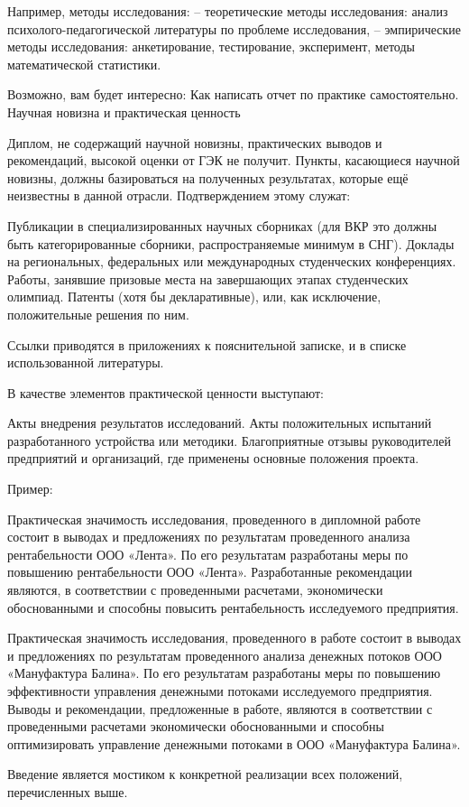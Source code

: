     Например, методы исследования:
    – теоретические методы исследования: анализ психолого-педагогической литературы по проблеме исследования,
    – эмпирические методы исследования: анкетирование, тестирование, эксперимент, методы математической статистики.

Возможно, вам будет интересно: Как написать отчет по практике самостоятельно.
Научная новизна и практическая ценность

Диплом, не содержащий научной новизны, практических выводов и рекомендаций, высокой оценки от ГЭК не получит. Пункты, касающиеся научной новизны, должны базироваться на полученных результатах, которые ещё неизвестны в данной отрасли. Подтверждением этому служат:

    Публикации в специализированных научных сборниках (для ВКР это должны быть категорированные сборники, распространяемые минимум в СНГ).
    Доклады на региональных, федеральных или международных студенческих конференциях.
    Работы, занявшие призовые места на завершающих этапах студенческих олимпиад.
    Патенты (хотя бы декларативные), или, как исключение, положительные решения по ним.

Ссылки приводятся в приложениях к пояснительной записке, и в списке использованной литературы.

В качестве элементов практической ценности выступают:

    Акты внедрения результатов исследований.
    Акты положительных испытаний разработанного устройства или методики.
    Благоприятные отзывы руководителей предприятий и организаций, где применены  основные положения проекта.

    Пример:

    Практическая значимость исследования, проведенного в дипломной работе состоит в выводах и предложениях по результатам проведенного анализа рентабельности ООО «Лента». По его результатам разработаны меры по повышению рентабельности ООО «Лента». Разработанные рекомендации являются, в соответствии с проведенными расчетами, экономически обоснованными и способны повысить рентабельность исследуемого предприятия.

    Практическая значимость исследования, проведенного в работе состоит в выводах и предложениях по результатам проведенного анализа денежных потоков ООО «Мануфактура Балина». По его результатам разработаны меры по повышению эффективности управления денежными потоками исследуемого предприятия. Выводы и рекомендации, предложенные в работе, являются в соответствии с проведенными расчетами экономически обоснованными и способны оптимизировать управление денежными потоками в ООО «Мануфактура Балина».

Введение является мостиком к конкретной  реализации всех положений, перечисленных выше.

\clearpage
